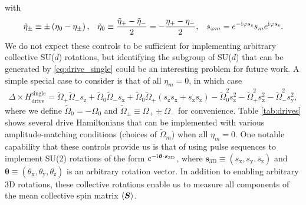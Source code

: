 \documentclass[nofootinbib,notitlepage,11pt]{revtex4-2}
\renewcommand{\t}{\text} %
\newcommand{\f}[2]{\dfrac{#1}{#2}} %
\newcommand{\p}[1]{\left(#1\right)} %
\newcommand{\bk}{\Braket} %
\renewcommand{\v}{\bm} %
\renewcommand{\c}{\cdot} %
\renewcommand{\i}{\mathrm{i}\mkern1mu} %
\newcommand{\1}{\mathds{1}}
\newcommand{\x}{\text{x}}
\newcommand{\y}{\text{y}}
\newcommand{\z}{\text{z}}
\begin{document}
with
\begin{align}
  \tilde\eta_\pm \equiv \pm\p{\eta_0 - \eta_\pm},
  &&
  \tilde\eta_0 \equiv \f{\tilde\eta_+ - \tilde\eta_-}{2}
  = -\f{\eta_+ - \eta_-}{2},
  &&
  s_{\varphi m} = e^{-\i\varphi s_\z} s_m e^{\i\varphi s_\z}.
\end{align}
We do not expect these controls to be sufficient for implementing arbitrary collective SU($d$) rotations, but identifying the subgroup of SU($d$) that can be generated by \eqref{eq:drive_single} could be an interesting problem for future work.
A simple special case to consider is that of all $\eta_m=0$, in which case
\begin{align}
  \Delta \times H_{\t{drive}}^{\t{single}}
  = \tilde\Omega_+ \tilde\Omega_- s_\z
  + \tilde\Omega_0 \tilde\Omega_- s_\x
  + \tilde\Omega_0 \tilde\Omega_+ \p{s_\z s_\x  + s_\x s_\z}
  - \tilde\Omega_0^2 s_\z^2 - \tilde\Omega_+^2 s_\x^2
  - \tilde\Omega_-^2 s_\y^2,
\end{align}
where we define $\tilde\Omega_0=-\Omega_0$ and $\tilde\Omega_\pm\equiv\Omega_+\pm\Omega_-$ for convenience.
Table \ref{tab:drives} shows several drive Hamiltonians that can be implemented with various amplitude-matching conditions (choices of $\tilde\Omega_m$) when all $\eta_m=0$.
One notable capability that these controls provide us is that of using pulse sequences to implement SU(2) rotations of the form $e^{-\i\v\theta\c\v s_{\t{3D}}}$, where $\v s_{\t{3D}}\equiv\p{s_\x,s_\y,s_\z}$ and $\v\theta\equiv\p{\theta_\x,\theta_\y,\theta_\z}$ is an arbitrary rotation vector.
In addition to enabling arbitrary 3D rotations, these collective rotations enable us to measure all components of the mean collective spin matrix $\bk{\v S}$.
\end{document}
